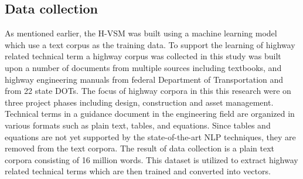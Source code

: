 \documentclass[Journal, InsideFigs, DoubleSpace]{ascelike} %
\begin{document}
\subsection{Data collection}
As mentioned earlier, the H-VSM was built using a machine learning model which use a text corpus as the training data. To support the learning of highway related technical term a highway corpus was collected in this study was built upon a number of documents from multiple sources including textbooks, and highway engineering manuals from federal Department of Transportation and from 22 state DOTs. The focus of highway corpora in this this research were on three  project phases including design, construction and asset management. Technical terms in a guidance document in the engineering field are organized in various formats such as plain text, tables, and equations. Since tables and equations are not yet supported by the state-of-the-art NLP techniques, they are removed from the text corpora. The result of data collection is a plain text corpora consisting of 16 million words. This dataset is utilized to extract highway related technical terms which are then trained and converted into vectors.
%
\end{document}
